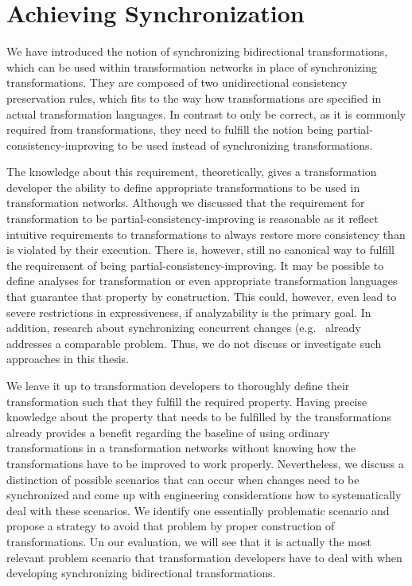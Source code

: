 \section{Achieving Synchronization} %

We have introduced the notion of synchronizing bidirectional transformations, which can be used within transformation networks in place of synchronizing transformations.
They are composed of two unidirectional consistency preservation rules, which fits to the way how transformations are specified in actual transformation languages.
In contrast to only be correct, as it is commonly required from transformations, they need to fulfill the notion being partial-consistency-improving to be used instead of synchronizing transformations.

The knowledge about this requirement, theoretically, gives a transformation developer the ability to define appropriate transformations to be used in transformation networks.
Although we discussed that the requirement for transformation to be partial-consistency-improving is reasonable as it reflect intuitive requirements to transformations to always restore more consistency than is violated by their execution.
There is, however, still no canonical way to fulfill the requirement of being partial-consistency-improving.
It may be possible to define analyses for transformation or even appropriate transformation languages that guarantee that property by construction.
This could, however, even lead to severe restrictions in expressiveness, if analyzability is the primary goal.
In addition, research about synchronizing concurrent changes (e.g.~\cite{hermann2012concurrentSynchronization-FASE,orejas2020IncrementalConcurrentSynchronization-FASE,xiong2013SynchronizingConcurrentUpdates-SoSym,xiong2009parallelUpdates-ICMT} already addresses a comparable problem.
Thus, we do not discuss or investigate such approaches in this thesis.

We leave it up to transformation developers to thoroughly define their transformation such that they fulfill the required property.
Having precise knowledge about the property that needs to be fulfilled by the transformations already provides a benefit regarding the baseline of using ordinary transformations in a transformation networks without knowing how the transformations have to be improved to work properly.
Nevertheless, we discuss a distinction of possible scenarios that can occur when changes need to be synchronized and come up with engineering considerations how to systematically deal with these scenarios.
We identify one essentially problematic scenario and propose a strategy to avoid that problem by proper construction of transformations.
Un our evaluation, we will see that it is actually the most relevant problem scenario that transformation developers have to deal with when developing synchronizing bidirectional transformations.

